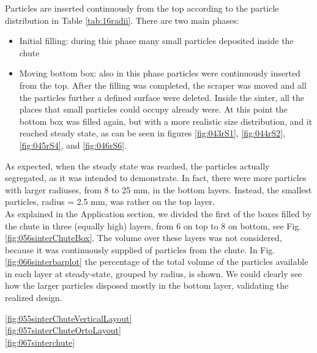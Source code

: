 
Particles are inserted continuously from the top according to the particle
distribution in Table \ref{tab:16radii}.
There are two main phases:
\begin{itemize}
  \item{Initial filling: during this phase many small particles deposited inside
  the chute}
  \item{Moving bottom box: also in this phase particles were
continuously inserted from the top. After the filling was completed, the
scraper was moved and all the particles further a defined surface were
deleted. Inside the sinter, all the places that small particles could
occupy already were. At this point the bottom box was filled again, but
with a more realistic size distribution, and it reached steady state, as can
be seen in figures \ref{fig:043rS1}, \ref{fig:044rS2}, \ref{fig:045rS4}, and
\ref{fig:046rS6}.}
\end{itemize}
As expected, when the steady state was reached, the particles actually
segregated, as it was intended to demonstrate.
In fact, there were more particles with larger radiuses, from 8 to 25 mm, in the
bottom layers.
Instead, the smallest particles, radius = 2.5 mm, was rather on the top layer.\\ 
As explained in the Application section, we divided the first of the boxes
filled by the chute in three (equally high) layers, from 6 on top to 8 
on bottom, see Fig. \ref{fig:056sinterChuteBox}. 
The volume over these layers was not considered, because it was continuously 
supplied of particles from the chute. In Fig. \ref{fig:066sinterbarplot} the
percentage of the total volume of the particles available in each layer at steady-state, 
grouped by radius, is shown. 
We could clearly see how the larger particles disposed mostly 
in the bottom layer, validating the realized design.



\ref{fig:055sinterChuteVerticalLayout} \\





\ref{fig:057sinterChuteOrtoLayout} \\


\ref{fig:067sinterchute}\\




